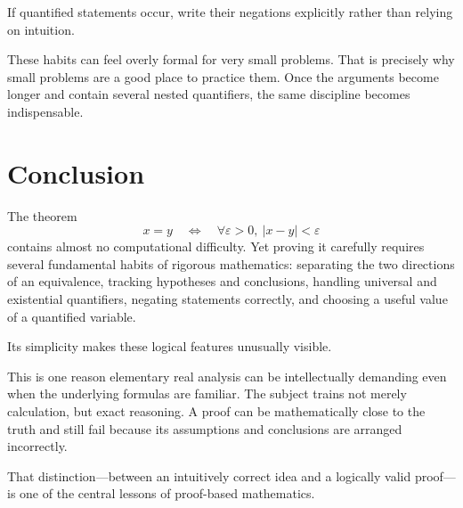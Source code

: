 \documentclass{essay}
\begin{document}
If quantified statements occur, write their negations explicitly rather than relying on intuition.

These habits can feel overly formal for very small problems. That is precisely why small problems are a good place to practice them. Once the arguments become longer and contain several nested quantifiers, the same discipline becomes indispensable.

\section{Conclusion}

The theorem
\[
x=y
\quad\Longleftrightarrow\quad
\forall \varepsilon>0,\ |x-y|<\varepsilon
\]
contains almost no computational difficulty. Yet proving it carefully requires several fundamental habits of rigorous mathematics: separating the two directions of an equivalence, tracking hypotheses and conclusions, handling universal and existential quantifiers, negating statements correctly, and choosing a useful value of a quantified variable.

Its simplicity makes these logical features unusually visible.

This is one reason elementary real analysis can be intellectually demanding even when the underlying formulas are familiar. The subject trains not merely calculation, but exact reasoning. A proof can be mathematically close to the truth and still fail because its assumptions and conclusions are arranged incorrectly.

That distinction---between an intuitively correct idea and a logically valid proof---is one of the central lessons of proof-based mathematics.
\end{document}
